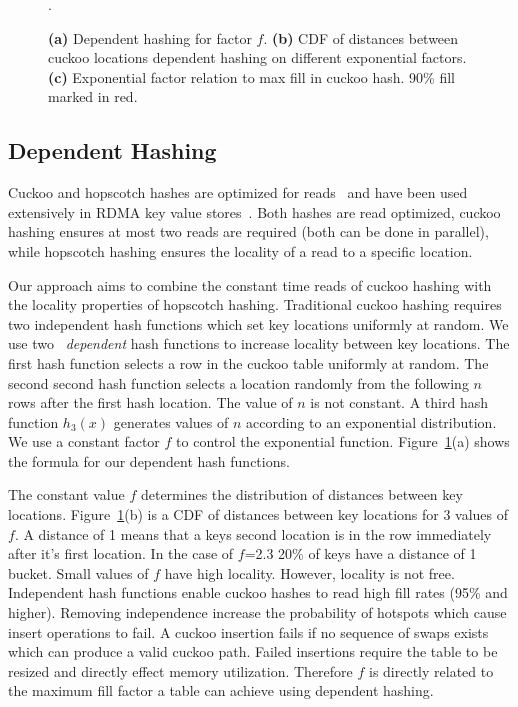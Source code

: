 \begin{figure}[t]
\begin{subfigure}{0.3\linewidth}
    \end{subfigure}.
    \vspace{-1em}
    \caption{
    \textbf{(a)} Dependent hashing for factor $f$.
    \textbf{(b)} CDF of distances between cuckoo locations dependent hashing on different exponential factors.
    \textbf{(c)} Exponential factor relation to max fill in cuckoo hash. 90\% fill marked in red.
    }
    \label{fig:locality-hashing}

\end{figure}




\subsection{Dependent Hashing}

Cuckoo and hopscotch hashes are optimized for
reads~\cite{cuckoo,hopscotch} and have been used extensively
in RDMA key value
stores~\cite{memc3,cuckoo-improvements,pilaf,farm}. Both
hashes are read optimized, cuckoo hashing ensures at most
two reads are required (both can be done in parallel), while
hopscotch hashing ensures the locality of a read to a
specific location.

Our approach aims to combine the constant time reads of
cuckoo hashing with the locality properties of hopscotch
hashing. Traditional cuckoo hashing requires two independent
hash functions which set key locations uniformly at random.
We use two ~\textit{dependent} hash functions to increase
locality between key locations. The first hash function
selects a row in the cuckoo table uniformly at random. The
second second hash function selects a location randomly from
the following $n$ rows after the first hash location. The
value of $n$ is not constant. A third hash function $h_3(x)$
generates values of $n$ according to an exponential
distribution. We use a constant factor $f$ to control the
exponential function.  Figure~\ref{fig:locality-hashing}(a)
shows the formula for our dependent hash functions.

The constant value $f$ determines the distribution of
distances between key locations.
Figure~\ref{fig:locality-hashing}(b) is a CDF of distances
between key locations for 3 values of $f$. A distance of 1
means that a keys second location is in the row immediately
after it's first location. In the case of $f$=2.3 20\% of
keys have a distance of 1 bucket. Small values of $f$ have
high locality. However, locality is not free. Independent%
hash functions enable cuckoo hashes to read high fill rates (95\% and higher).
Removing independence increase the probability of
hotspots which cause insert operations to fail. A cuckoo
insertion fails if no sequence of swaps exists which can
produce a valid cuckoo path. Failed insertions require the
table to be resized and directly effect memory utilization.
Therefore $f$ is directly related to the maximum fill factor
a table can achieve using dependent hashing.

